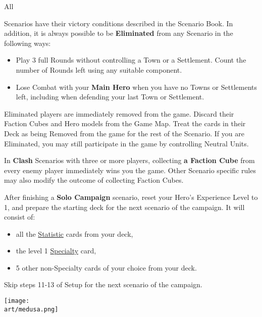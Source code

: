 
\begin{multicols*}{2}

\hypertarget{End}{All} Scenarios have their victory conditions described in the Scenario Book.
In addition, it is always possible to be \textbf{Eliminated} from any Scenario in the following ways:
\begin{itemize}
  \item Play 3 full Rounds without controlling a Town or a Settlement.
    Count the number of Rounds left using any suitable component.
  \item Lose Combat with your \textbf{Main Hero} when you have no Towns or Settlements left, including when defending your last Town or Settlement.
\end{itemize}
Eliminated players are immediately removed from the game.
Discard their Faction Cubes and Hero models from the Game Map.
Treat the cards in their Deck as being Removed from the game for the rest of the Scenario.
If you are Eliminated, you may still participate in the game by controlling Neutral Units.\par
{}\par

In \textbf{Clash} Scenarios with three or more players, collecting \textbf{a Faction Cube} from every enemy player immediately wins you the game.
Other Scenario specific rules may also modify the outcome of collecting Faction Cubes.

\columnbreak

After finishing a \textbf{Solo Campaign} scenario, reset your Hero's Experience Level to 1, and prepare the starting deck for the next scenario of the campaign.
It will consist of:
\begin{itemize}
  \item all the \hyperlink{Statistic}{Statistic} cards from your deck,
  \item the level 1 \hyperlink{Specialty}{Specialty} card,
  \item 5 other non-Specialty cards of your choice from your deck.
\end{itemize}
Skip steps 11-13 of Setup for the next scenario of the campaign.

\vspace*{\fill}
\hspace{-6em}
\texttt{[image: \\art/medusa.png]}

\end{multicols*}
